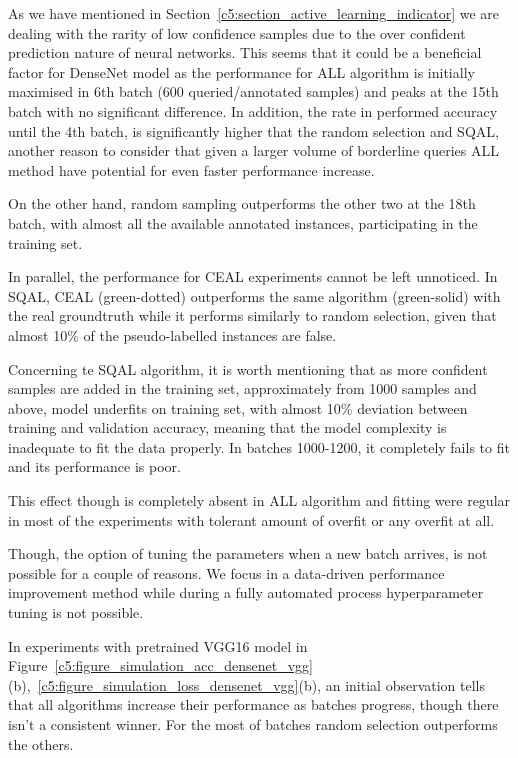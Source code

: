 As we have mentioned in Section~\ref{c5:section_active_learning_indicator} we are dealing with the rarity of low confidence samples due to the over confident prediction nature of neural networks. This seems that it could be a beneficial factor for DenseNet model as the performance for ALL algorithm is initially maximised in 6th batch (600 queried/annotated samples) and peaks at the 15th batch with no significant difference.
In addition, the rate in performed accuracy until the 4th batch, is significantly higher that the random selection and SQAL, another reason to consider that given a larger volume of borderline queries ALL method have potential for even faster performance increase.

On the other hand, random sampling outperforms the other two at the 18th batch, with almost all the available annotated instances, participating in the training set.

In parallel, the performance for CEAL experiments cannot be left unnoticed. In SQAL, CEAL (green-dotted) outperforms the same algorithm (green-solid) with the real groundtruth while it performs similarly to random selection, given that almost 10\% of the pseudo-labelled instances are false. %

Concerning te SQAL algorithm, it is worth mentioning that as more confident samples are added in the training set, approximately from 1000 samples and above, model underfits on training set, with almost 10\% deviation between training and validation accuracy, meaning that the model complexity is inadequate to fit the data properly.
In batches 1000-1200, it completely fails to fit and its performance is poor.

This effect though is completely absent in ALL algorithm and fitting were regular in most of the experiments with tolerant amount of overfit or any overfit at all.

Though, the option of tuning the parameters when a new batch arrives, is not possible for a couple of reasons. We focus in a data-driven performance improvement method while during a fully automated process hyperparameter tuning is not possible.


In experiments with pretrained VGG16 model in Figure~\ref{c5:figure_simulation_acc_densenet_vgg}(b),~\ref{c5:figure_simulation_loss_densenet_vgg}(b), an initial observation tells that all algorithms increase their performance as batches progress, though there isn't a consistent winner.
For the most of batches random selection outperforms the others.


